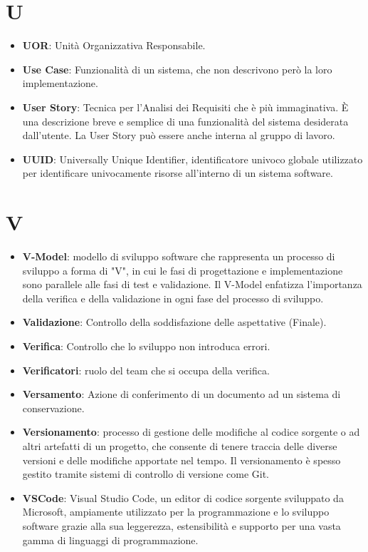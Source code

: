 \documentclass[a4paper,12pt]{article}
\begin{document}
\section{U}
\begin{itemize}
    \item \textbf{UOR}: Unità Organizzativa Responsabile.
    \item \textbf{Use Case}: Funzionalità di un sistema, che non descrivono però la loro implementazione.
    \item \textbf{User Story}: Tecnica per l'Analisi dei Requisiti che è più immaginativa. È una descrizione breve e semplice di una funzionalità del sistema desiderata dall'utente. La User Story può essere anche interna al gruppo di lavoro.
    \item \textbf{UUID}: Universally Unique Identifier, identificatore univoco globale utilizzato per identificare univocamente risorse all'interno di un sistema software.
\end{itemize}
\section{V}
\begin{itemize}
    \item \textbf{V-Model}: modello di sviluppo software che rappresenta un processo di sviluppo a forma di "V", in cui le fasi di progettazione e implementazione sono parallele alle fasi di test e validazione. Il V-Model enfatizza l'importanza della verifica e della validazione in ogni fase del processo di sviluppo.
\end{itemize}
\begin{itemize}
    \item \textbf{Validazione}: Controllo della soddisfazione delle aspettative (Finale).
    \item \textbf{Verifica}: Controllo che lo sviluppo non introduca errori.
    \item \textbf{Verificatori}: ruolo del team che si occupa della verifica.
    \item \textbf{Versamento}: Azione di conferimento di un documento ad un sistema di conservazione.
    \item \textbf{Versionamento}: processo di gestione delle modifiche al codice sorgente o ad altri artefatti di un progetto, che consente di tenere traccia delle diverse versioni e delle modifiche apportate nel tempo. Il versionamento è spesso gestito tramite sistemi di controllo di versione come Git.
    \item \textbf{VSCode}: Visual Studio Code, un editor di codice sorgente sviluppato da Microsoft, ampiamente utilizzato per la programmazione e lo sviluppo software grazie alla sua leggerezza, estensibilità e supporto per una vasta gamma di linguaggi di programmazione.
\end{itemize}
\end{document}
